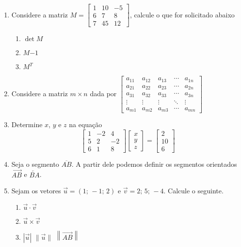 \documentclass[a4paper, 12pt]{article}
\begin{document}
 
\begin{enumerate}
 \item Considere a matriz
 $M = \begin{bmatrix}
    1 & 10 & -5 \\
    6 & 7 & 8 \\
    7 & 45 & 12
 \end{bmatrix}
 $, calcule o que for solicitado abaixo
 \begin{enumerate}
  \item $\det M$
  \item $M{-1}$
  \item $M^T$
 \end{enumerate}
 
 \item Considere a matriz $m\times n$ dada por
 $\begin{bmatrix}
  a_{11} & a_{12} & a_{13} & \cdots & a_{1n} \\
  a_{21} & a_{22} & a_{23} & \cdots & a_{2n} \\
  a_{31} & a_{32} & a_{33} & \cdots & a_{3n} \\
  \vdots & \vdots & \vdots & \ddots & \vdots \\
  a_{m1} & a_{m2} & a_{m3} & \cdots & a_{mn}
 \end{bmatrix}
 $ 
 
 \item Determine $x$, $y$ e $z$ na equação
 $$\begin{bmatrix}
  1 & -2 & 4 \\
  5 & 2 & -2 \\
  6 & 1 & 8 
 \end{bmatrix}
 \begin{bmatrix}
  x  \\
  y  \\
  z  
 \end{bmatrix}
 =
 \begin{bmatrix}
  2  \\
  10  \\
  6 
 \end{bmatrix}
 $$
 
 \item Seja o segmento $\overline{AB}$. A partir dele podemos definir os segmentos orientados $\overrightarrow{AB}$ e $\overleftarrow{BA}$.
 \item Sejam os vetores $\vec{u} = (1;\, -1;\, 2)$ e $\vec{v} = {2;\, 5;\, -4}$. Calcule o seguinte.
 \begin{enumerate}
  \item $\vec{u} \cdot \vec{v}$
  \item $\vec{u} \times \vec{v}$
  \item $|\vec{u}|$ $\|\vec{u}\|$ $\left\|\overrightarrow{AB}\right\|$
 \end{enumerate}
 

\end{enumerate}
\end{document}
